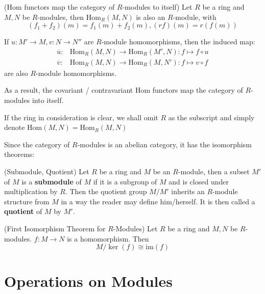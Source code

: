 \documentclass{note-eng}
\begin{document}
\begin{proposition}\label{prop:hom-functor-map-R-module-to-itself}
    (Hom functors map the category of $R$-modules to itself) Let $R$ be a ring and $M, N$ be $R$-modules, then $\mathrm{Hom}_{R}(M, N)$ is also an $R$-module, with
    $$(f_1 + f_2)(m) = f_1(m) + f_2(m), (rf)(m) = r(f(m))$$

    If $u: M' \rightarrow M, v: N \rightarrow N''$ are $R$-module homomorphisms, then the induced map:
    $$
        \begin{aligned}
        \overline{u}: &\mathrm{Hom}_{R}(M, N) \rightarrow \mathrm{Hom}_{R}(M', N): f \mapsto f \circ u \\
        \overline{v}: &\mathrm{Hom}_{R}(M, N) \rightarrow \mathrm{Hom}_{R}(M, N'): f \mapsto v \circ f
        \end{aligned}
    $$
    are also $R$-module homomorphisms.

    As a result, the covariant / contravariant Hom functors map the category of $R$-modules into itself.
\end{proposition}

If the ring in consideration is clear, we shall omit $R$ as the subscript and simply denote $\mathrm{Hom}(M, N) = \mathrm{Hom}_{R}(M, N)$

Since the category of $R$-modules is an abelian category, it has the isomorphism theorems:

\begin{definition}
    (Submodule, Quotient) Let $R$ be a ring and $M$ be an $R$-module, then a subset $M'$ of $M$ is a \textbf{submodule} of $M$ if it is a subgroup of $M$ and is closed under multiplication by $R$. Then the quotient group $M / M'$ inherits an $R$-module structure from $M$ in a way the reader may define him/herself. It is then called a \textbf{quotient} of $M$ by $M'$.
\end{definition}

\begin{theorem}
    (First Isomorphism Theorem for $R$-Modules) Let $R$ be a ring and $M, N$ be $R$-modules. $f: M \rightarrow N$ is a homomorphism. Then
    $$M / \ker (f) \cong \mathrm{im}(f)$$
\end{theorem}

\section{Operations on Modules}
\end{document}
